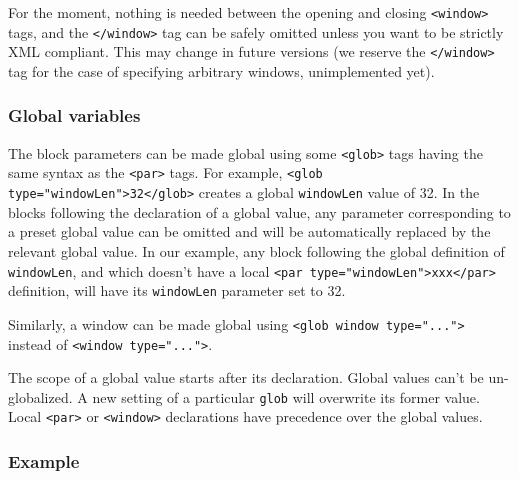 \documentclass[11pt,a4paper]{article}
\begin{document}
\begin{itemize}
  For the moment, nothing is needed between the opening and closing
  \verb+<window>+ tags, and the \verb+</window>+ tag can be safely omitted
  unless you want to be strictly XML compliant. This may change in future
  versions (we reserve the \verb+</window>+ tag for the case of specifying
  arbitrary windows, unimplemented yet).

\end{itemize}


\subsubsection*{Global variables}

The block parameters can be made global using some \verb+<glob>+ tags having
the same syntax as the \verb+<par>+ tags. For example, \verb+<glob type="windowLen">32</glob>+
creates a global \verb+windowLen+ value of 32. In
the blocks following the declaration of a global value, any parameter
corresponding to a preset global value can be omitted and will be automatically
replaced by the relevant global value. In our example, any block following the
global definition of \verb+windowLen+, and which doesn't have a local
\verb+<par type="windowLen">xxx</par>+ definition, will have its \verb+windowLen+ parameter
set to 32.

Similarly, a window can be made global using \verb+<glob window type="...">+
instead of \linebreak \verb+<window type="...">+.

The scope of a global value starts after its declaration. Global values can't
be un-globalized. A new setting of a particular \verb+glob+ will overwrite its
former value. Local \verb+<par>+ or \verb+<window>+ declarations have
precedence over the global values.


\subsubsection*{Example}
\end{document}
